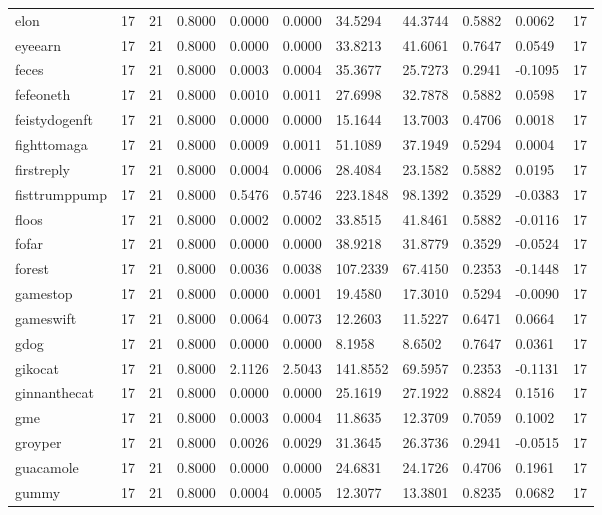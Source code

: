 \begin{table}[htbp]
\begin{tabular}{lllllllllll}
elon & 17 & 21 & 0.8000 & 0.0000 & 0.0000 & 34.5294 & 44.3744 & 0.5882 & 0.0062 & 17 \\
eyeearn & 17 & 21 & 0.8000 & 0.0000 & 0.0000 & 33.8213 & 41.6061 & 0.7647 & 0.0549 & 17 \\
feces & 17 & 21 & 0.8000 & 0.0003 & 0.0004 & 35.3677 & 25.7273 & 0.2941 & -0.1095 & 17 \\
fefeoneth & 17 & 21 & 0.8000 & 0.0010 & 0.0011 & 27.6998 & 32.7878 & 0.5882 & 0.0598 & 17 \\
feistydogenft & 17 & 21 & 0.8000 & 0.0000 & 0.0000 & 15.1644 & 13.7003 & 0.4706 & 0.0018 & 17 \\
fighttomaga & 17 & 21 & 0.8000 & 0.0009 & 0.0011 & 51.1089 & 37.1949 & 0.5294 & 0.0004 & 17 \\
firstreply & 17 & 21 & 0.8000 & 0.0004 & 0.0006 & 28.4084 & 23.1582 & 0.5882 & 0.0195 & 17 \\
fisttrumppump & 17 & 21 & 0.8000 & 0.5476 & 0.5746 & 223.1848 & 98.1392 & 0.3529 & -0.0383 & 17 \\
floos & 17 & 21 & 0.8000 & 0.0002 & 0.0002 & 33.8515 & 41.8461 & 0.5882 & -0.0116 & 17 \\
fofar & 17 & 21 & 0.8000 & 0.0000 & 0.0000 & 38.9218 & 31.8779 & 0.3529 & -0.0524 & 17 \\
forest & 17 & 21 & 0.8000 & 0.0036 & 0.0038 & 107.2339 & 67.4150 & 0.2353 & -0.1448 & 17 \\
gamestop & 17 & 21 & 0.8000 & 0.0000 & 0.0001 & 19.4580 & 17.3010 & 0.5294 & -0.0090 & 17 \\
gameswift & 17 & 21 & 0.8000 & 0.0064 & 0.0073 & 12.2603 & 11.5227 & 0.6471 & 0.0664 & 17 \\
gdog & 17 & 21 & 0.8000 & 0.0000 & 0.0000 & 8.1958 & 8.6502 & 0.7647 & 0.0361 & 17 \\
gikocat & 17 & 21 & 0.8000 & 2.1126 & 2.5043 & 141.8552 & 69.5957 & 0.2353 & -0.1131 & 17 \\
ginnanthecat & 17 & 21 & 0.8000 & 0.0000 & 0.0000 & 25.1619 & 27.1922 & 0.8824 & 0.1516 & 17 \\
gme & 17 & 21 & 0.8000 & 0.0003 & 0.0004 & 11.8635 & 12.3709 & 0.7059 & 0.1002 & 17 \\
groyper & 17 & 21 & 0.8000 & 0.0026 & 0.0029 & 31.3645 & 26.3736 & 0.2941 & -0.0515 & 17 \\
guacamole & 17 & 21 & 0.8000 & 0.0000 & 0.0000 & 24.6831 & 24.1726 & 0.4706 & 0.1961 & 17 \\
gummy & 17 & 21 & 0.8000 & 0.0004 & 0.0005 & 12.3077 & 13.3801 & 0.8235 & 0.0682 & 17 \\

\end{tabular}
\end{table}
